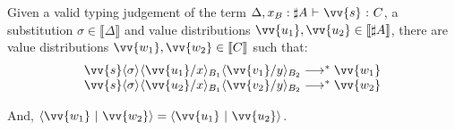 \documentclass[runningheads,orivec,envcountsame,envcountsect]{llncs}
\newcommand\lra{\longrightarrow}
\newcommand\ansubst[2]{\ensuremath{\langle #1 \rangle_{#2}}}
\def\scal#1#2{\langle{#1}~|~{#2}\rangle}
\def\eval{\lra^*}
\def\sem#1{\llbracket#1\rrbracket}
\def\TYP#1#2#3{#1~{\vdash}~#2~{:}~#3}
\begin{document}
\begin{lemma}\label{lem:InnerProdSingleVar} %
Given a valid typing judgement of the term $\TYP{\Delta,x_B:\sharp A}{\vv{s}}{C}$, a substitution $\sigma\in\sem{\Delta}$ and value distributions $\vv{u_1},\vv{u_2}\in\sem{\sharp A}$, there are value distributions $\vv{w_1}, \vv{w_2}\in\sem{C}$ such that:
\[
\begin{array}{c}
    \vv{s}\ansubst{\sigma}{}\ansubst{\vv{u_1}/x}{B_1}{\ansubst{\vv{v_1}/y}{B_2}}\eval\vv{w_1}\\
    \vv{s}\ansubst{\sigma}{}\ansubst{\vv{u_2}/x}{B_1}{\ansubst{\vv{v_2}/y}{B_2}}\eval\vv{w_2}\\
\end{array}
\]

And, $\scal{\vv{w_1}}{\vv{w_2}} = \scal{\vv{u_1}}{\vv{u_2}}$.
\end{lemma}
\end{document}
